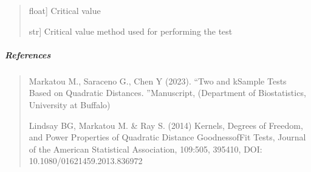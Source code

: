 \documentclass[letterpaper,10pt,english,openany,oneside]{sphinxmanual}
\begin{document}
{{{{\begin{fulllineitems}
\begin{quote}
\begin{description}
\sphinxlineitem{cv\_}{[}float{]}
\sphinxAtStartPar
Critical value

\sphinxlineitem{cv\_method\_}{[}str{]}
\sphinxAtStartPar
Critical value method used for performing the test

\end{description}
\end{quote}


\subparagraph{References}
\label{\detokenize{api_reference/generated/QuadratiK.kernel_test.KernelTest:references}}\begin{quote}

\sphinxAtStartPar
Markatou M., Saraceno G., Chen Y (2023). “Two\sphinxhyphen{} and k\sphinxhyphen{}Sample Tests Based on Quadratic Distances.
”Manuscript, (Department of Biostatistics, University at Buffalo)

\sphinxAtStartPar
Lindsay BG, Markatou M. \& Ray S. (2014) Kernels, Degrees of Freedom, and
Power Properties of Quadratic Distance Goodness\sphinxhyphen{}of\sphinxhyphen{}Fit Tests, Journal of the American Statistical
Association, 109:505, 395\sphinxhyphen{}410, DOI: 10.1080/01621459.2013.836972
\end{quote}



\end{fulllineitems}}}}}
\end{document}
